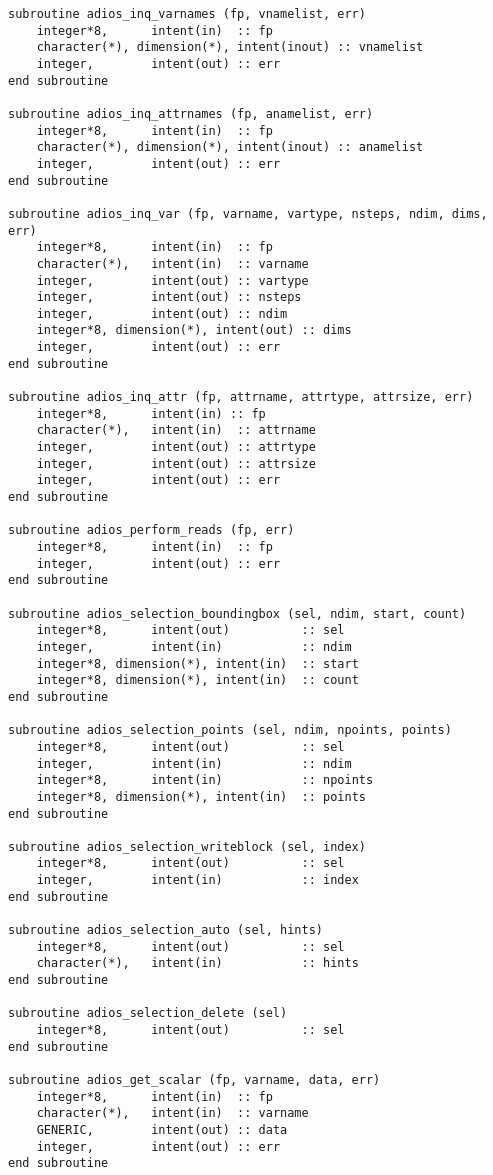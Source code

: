 \begin{lstlisting}[language=ADIOS,alsolanguage=Fortran]
subroutine adios_inq_varnames (fp, vnamelist, err)
    integer*8,      intent(in)  :: fp
    character(*), dimension(*), intent(inout) :: vnamelist
    integer,        intent(out) :: err
end subroutine

subroutine adios_inq_attrnames (fp, anamelist, err)
    integer*8,      intent(in)  :: fp
    character(*), dimension(*), intent(inout) :: anamelist
    integer,        intent(out) :: err
end subroutine

subroutine adios_inq_var (fp, varname, vartype, nsteps, ndim, dims, err)
    integer*8,      intent(in)  :: fp
    character(*),   intent(in)  :: varname
    integer,        intent(out) :: vartype
    integer,        intent(out) :: nsteps
    integer,        intent(out) :: ndim
    integer*8, dimension(*), intent(out) :: dims
    integer,        intent(out) :: err
end subroutine

subroutine adios_inq_attr (fp, attrname, attrtype, attrsize, err)
    integer*8,      intent(in) :: fp
    character(*),   intent(in)  :: attrname
    integer,        intent(out) :: attrtype
    integer,        intent(out) :: attrsize
    integer,        intent(out) :: err
end subroutine

subroutine adios_perform_reads (fp, err)
    integer*8,      intent(in)  :: fp
    integer,        intent(out) :: err
end subroutine

subroutine adios_selection_boundingbox (sel, ndim, start, count)
    integer*8,      intent(out)          :: sel
    integer,        intent(in)           :: ndim
    integer*8, dimension(*), intent(in)  :: start
    integer*8, dimension(*), intent(in)  :: count
end subroutine

subroutine adios_selection_points (sel, ndim, npoints, points)
    integer*8,      intent(out)          :: sel
    integer,        intent(in)           :: ndim
    integer*8,      intent(in)           :: npoints
    integer*8, dimension(*), intent(in)  :: points
end subroutine

subroutine adios_selection_writeblock (sel, index)
    integer*8,      intent(out)          :: sel
    integer,        intent(in)           :: index
end subroutine

subroutine adios_selection_auto (sel, hints)
    integer*8,      intent(out)          :: sel
    character(*),   intent(in)           :: hints
end subroutine

subroutine adios_selection_delete (sel)
    integer*8,      intent(out)          :: sel
end subroutine

subroutine adios_get_scalar (fp, varname, data, err)
    integer*8,      intent(in)  :: fp
    character(*),   intent(in)  :: varname
    GENERIC,        intent(out) :: data
    integer,        intent(out) :: err
end subroutine


\end{lstlisting}
